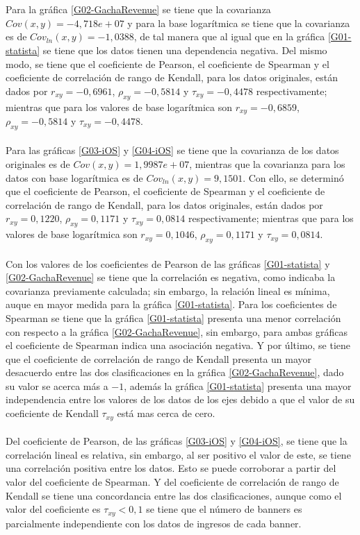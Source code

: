 \documentclass[osajnl,twocolumn,showpacs,superscriptaddress,10pt]{revtex4-2}
\begin{document}
\\\\
Para la gráfica \ref{G02-GachaRevenue} se tiene que la covarianza $Cov(x,y)=-4,718e+07$ y para la base logarítmica se tiene que la covarianza es de $Cov_{ln}(x,y)=-1,0388$, de tal manera que al igual que en la gráfica \ref{G01-statista} se tiene que los datos tienen una dependencia negativa. Del mismo modo, se tiene que el coeficiente de Pearson, el coeficiente de Spearman y el coeficiente de correlación de rango de Kendall, para los datos originales, están dados por $r_{xy}=-0,6961$, $\rho_{xy}=-0,5814$ y $\tau_{xy}=-0,4478$ respectivamente; mientras que para los valores de base logarítmica son $r_{xy}=-0,6859$, $\rho_{xy}=-0,5814$ y $\tau_{xy}=-0,4478$.
\\\\
Para las gráficas \ref{G03-iOS} y \ref{G04-iOS} se tiene que la covarianza de los datos originales es de $Cov(x,y)=1,9987e+07$, mientras que la covarianza para los datos con base logarítmica  es de $Cov_{ln}(x,y)=9,1501$. Con ello, se determinó que el coeficiente de Pearson, el coeficiente de Spearman y el coeficiente de correlación de rango de Kendall, para los datos originales, están dados por $r_{xy}=0,1220$, $\rho_{xy}=0,1171$ y $\tau_{xy}=0,0814$ respectivamente; mientras que para los valores de base logarítmica son $r_{xy}=0,1046$, $\rho_{xy}=0,1171$ y $\tau_{xy}=0,0814$.
\\\\
Con los valores de los coeficientes de Pearson de las gráficas \ref{G01-statista} y \ref{G02-GachaRevenue} se tiene que la correlación es negativa, como indicaba la covarianza previamente calculada; sin embargo, la relación lineal es mínima, auque en mayor medida para la gráfica \ref{G01-statista}. Para los coeficientes de Spearman se tiene que la gráfica \ref{G01-statista} presenta una menor correlación con respecto a la gráfica \ref{G02-GachaRevenue}, sin embargo, para ambas gráficas el coeficiente de Spearman indica una asociación negativa. Y por último, se tiene que el coeficiente de correlación de rango de Kendall presenta un mayor desacuerdo entre las dos clasificaciones en la gráfica \ref{G02-GachaRevenue}, dado su valor se acerca más a $-1$, además la gráfica \ref{G01-statista} presenta una mayor independencia entre los valores de los datos de los ejes debido a que el valor de su coeficiente de Kendall $\tau_{xy}$ está mas cerca de cero.
\\\\
Del coeficiente de Pearson, de las gráficas \ref{G03-iOS} y \ref{G04-iOS}, se tiene que la correlación lineal es relativa, sin embargo, al ser positivo el valor de este, se tiene una correlación positiva entre los datos. Esto se puede corroborar a partir del valor del coeficiente de Spearman. Y del coeficiente de correlación de rango de Kendall se tiene una concordancia entre las dos clasificaciones, aunque como el valor del coeficiente es $\tau_{xy}<0,1$ se tiene que el número de banners es parcialmente independiente con los datos de ingresos de cada banner.
\end{document}
